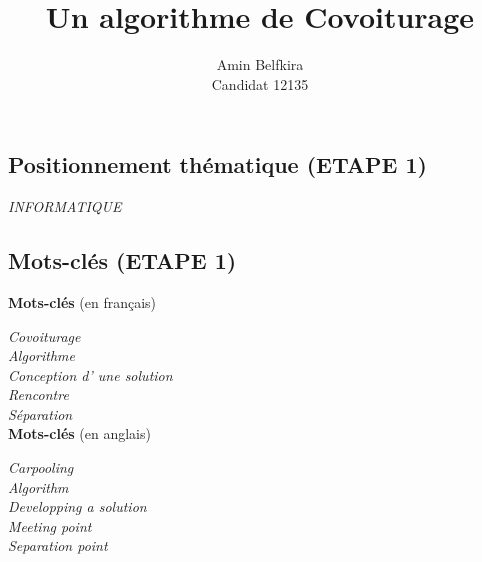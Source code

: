 \documentclass[a4paper, 11pt]{article}
\title{Un algorithme de Covoiturage}
\author{Amin Belfkira\\Candidat 12135}
\date{}
\begin{document}
\subsection*{Positionnement thématique (ETAPE 1)}

\hspace{1cm} \textit{INFORMATIQUE}\\

\subsection*{Mots-clés (ETAPE 1)}

\begin{multicols}{2}
  \textbf{Mots-clés} (en français)

  \textit{Covoiturage} \\
  \textit{Algorithme} \\
  \textit{Conception d' une solution} \\
  \textit{Rencontre} \\
  \textit{Séparation} \\

  \textbf{Mots-clés} (en anglais)

  \textit{Carpooling} \\
  \textit{Algorithm} \\
  \textit{Developping a solution} \\
  \textit{Meeting point} \\
  \textit{Separation point} \\
\end{multicols}


\cite{car}

\printbibliography
\end{document}
